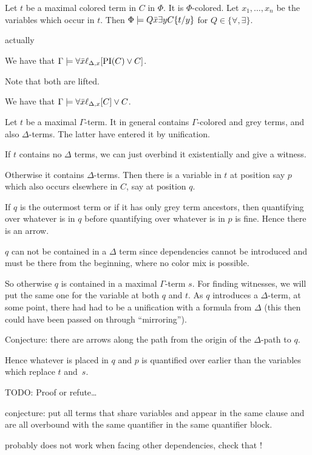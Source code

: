 \documentclass[,%
	paper=a4,%
	DIV20, 
	liststotoc,
	bibtotoc,
	draft=false,%
	numbers=noendperiod
]{scrartcl}
\begin{document}
\begin{lemma}

	Let $t$ be a maximal colored term in $C$ in $\Phi$. It is $\Phi$-colored.
	Let $x_1, \ldots, x_n$ be the variables which occur in $t$.
	Then $\Phi \models Q \bar x \exists y C\{t/y\}$ for $Q \in \{\forall, \exists\}$.

\end{lemma}

\clearpage

{\huge

	actually

	We have that $\Gamma \models \forall \bar x \ell_{\Delta,x}[ \operatorname{PI}(C) \lor C]$.

	Note that both are lifted.
	\medskip


}
We have that $\Gamma \models \forall \bar x \ell_{\Delta,x}[C] \lor C$.
\bigskip

Let $t$ be a maximal $\Gamma$-term.
It in general contains $\Gamma$-colored and grey terms, and also $\Delta$-terms.
The latter have entered it by unification.

If $t$ contains no $\Delta$ terms, we can just overbind it existentially and give a witness.

Otherwise it contains $\Delta$-terms.
Then there is a variable in $t$ at position say $p$ which also occurs elsewhere in $C$, say at position $q$.

If $q$ is the outermost term or if it has only grey term ancestors, then quantifying over whatever is in $q$ before quantifying over whatever is in $p$ is fine. Hence there is an arrow.

$q$ can not be contained in a $\Delta$ term since dependencies cannot be introduced and must be there from the beginning, where no color mix is possible.

So otherwise $q$ is contained in a maximal $\Gamma$-term $s$. For finding witnesses, we will put the same one for the variable at both $q$ and $t$.
As $q$ introduces a $\Delta$-term, at some point, there had had to be a unification with a formula from $\Delta$ (this then could have been passed on through ``mirroring'').

Conjecture: there are arrows along the path from the origin of the $\Delta$-path to $q$.

Hence whatever is placed in $q$ and $p$ is quantified over earlier than the variables which replace $t$ and~$s$.

TODO: Proof or refute\dots

{

	conjecture: put all terms that share variables and appear in the same clause and are all overbound with the same quantifier in the same quantifier block.

	probably does not work when facing other dependencies, check that !

}
\end{document}
